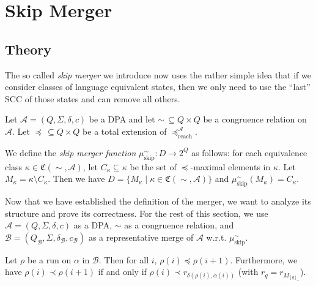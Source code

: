 
\chapter{Skip Merger}
\label{chap:skipper}

\section{Theory}
The so called \emph{skip merger} we introduce now uses the rather simple idea that if we consider classes of language equivalent states, then we only need to use the \enquote{last} SCC of those states and can remove all others.

\begin{defn}
	Let $\mathcal{A} = (Q, \Sigma, \delta, c)$ be a DPA and let $\sim \,\subseteq Q \times Q$ be a congruence relation on $\mathcal{A}$. Let $\preceq \,\subseteq Q \times Q$ be a total extension of $\preceq_\text{reach}^\mathcal{A}$. 
	
	We define the \emph{skip merger function} $\mu_\text{skip}^\sim : D \rightarrow 2^Q$ as follows: for each equivalence class $\kappa \in \mathfrak{C}(\sim, \mathcal{A})$, let $C_\kappa \subseteq \kappa$ be the set of $\preceq$-maximal elements in $\kappa$. Let $M_\kappa = \kappa \setminus C_\kappa$. Then we have $D = \{ M_\kappa \mid \kappa \in \mathfrak{C}(\sim, \mathcal{A}) \}$ and $\mu_\text{skip}^\sim(M_\kappa) = C_\kappa$.
\end{defn}

\vspace{5pt}

Now that we have established the definition of the merger, we want to analyze its structure and prove its correctness. For the rest of this section, we use $\mathcal{A} = (Q, \Sigma, \delta, c)$ as a DPA, $\sim$ as a congruence relation, and $\mathcal{B} = (Q_\mathcal{B}, \Sigma, \delta_\mathcal{B}, c_\mathcal{B})$ as a representative merge of $\mathcal{A}$ w.r.t. $\mu_\text{skip}^\sim$.

\begin{lem}
\label{lem:skip:run_growing}
	Let $\rho$ be a run on $\alpha$ in $\mathcal{B}$. Then for all $i$, $\rho(i) \preceq \rho(i+1)$.
	Furthermore, we have $\rho(i) \prec \rho(i+1)$ if and only if $\rho(i) \prec r_{\delta(\rho(i), \alpha(i))}$ (with $r_q = r_{M_{[q]_\sim}}$).
\end{lem}

